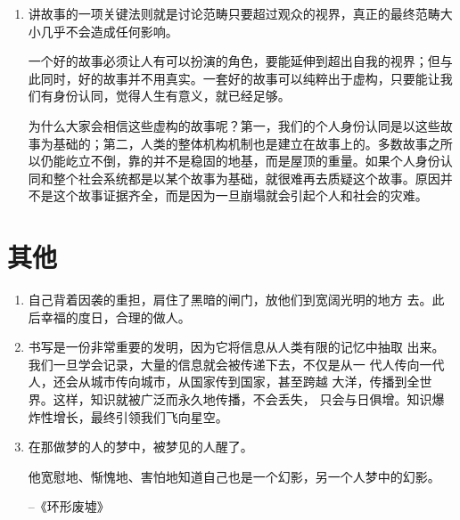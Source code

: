 \documentclass[UTF8]{ctexart}
\begin{document}
\begin{enumerate}
			\item 讲故事的一项关键法则就是讨论范畴只要超过观众的视界，真正的最终范畴大小几乎不会造成任何影响。
			
			一个好的故事必须让人有可以扮演的角色，要能延伸到超出自我的视界；但与此同时，好的故事并不用真实。一套好的故事可以纯粹出于虚构，只要能让我们有身份认同，觉得人生有意义，就已经足够。
			
			为什么大家会相信这些虚构的故事呢？第一，我们的个人身份认同是以这些故事为基础的；第二，人类的整体机构机制也是建立在故事上的。多数故事之所以仍能屹立不倒，靠的并不是稳固的地基，而是屋顶的重量。如果个人身份认同和整个社会系统都是以某个故事为基础，就很难再去质疑这个故事。原因并不是这个故事证据齐全，而是因为一旦崩塌就会引起个人和社会的灾难。
		\end{enumerate}
	\newpage
	
	
	\section{其他}
	
		\begin{enumerate}
			
			\item 自己背着因袭的重担，肩住了黑暗的闸门，放他们到宽阔光明的地方
			去。此后幸福的度日，合理的做人。
			
			\item 书写是一份非常重要的发明，因为它将信息从人类有限的记忆中抽取
			出来。我们一旦学会记录，大量的信息就会被传递下去，不仅是从一
			代人传向一代人，还会从城市传向城市，从国家传到国家，甚至跨越
			大洋，传播到全世界。这样，知识就被广泛而永久地传播，不会丢失，
			只会与日俱增。知识爆炸性增长，最终引领我们飞向星空。
			\item 在那做梦的人的梦中，被梦见的人醒了。
			
			他宽慰地、惭愧地、害怕地知道自己也是一个幻影，另一个人梦中的幻影。
			
			\hfill --《环形废墟》
			
		\end{enumerate}
		
		
	
	
	
\end{document}
